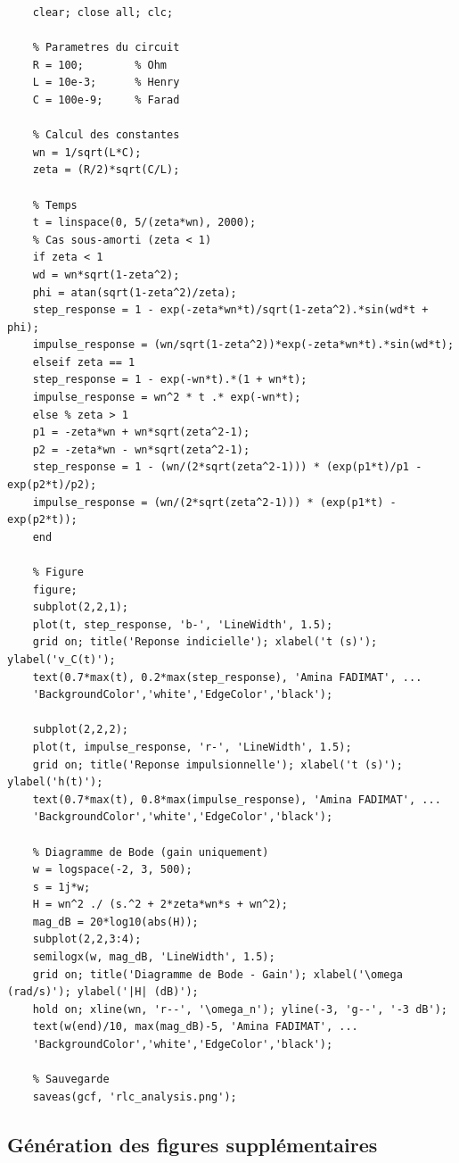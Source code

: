 \documentclass[12pt,a4paper]{article}
\begin{document}
	\begin{lstlisting}[caption=Analyse RLC sans toolbox]
	%% Analyse d'un circuit RLC (sans Control System Toolbox)
	clear; close all; clc;
	
	% Parametres du circuit
	R = 100;        % Ohm
	L = 10e-3;      % Henry
	C = 100e-9;     % Farad
	
	% Calcul des constantes
	wn = 1/sqrt(L*C);
	zeta = (R/2)*sqrt(C/L);
	
	% Temps
	t = linspace(0, 5/(zeta*wn), 2000);
	% Cas sous-amorti (zeta < 1)
	if zeta < 1
	wd = wn*sqrt(1-zeta^2);
	phi = atan(sqrt(1-zeta^2)/zeta);
	step_response = 1 - exp(-zeta*wn*t)/sqrt(1-zeta^2).*sin(wd*t + phi);
	impulse_response = (wn/sqrt(1-zeta^2))*exp(-zeta*wn*t).*sin(wd*t);
	elseif zeta == 1
	step_response = 1 - exp(-wn*t).*(1 + wn*t);
	impulse_response = wn^2 * t .* exp(-wn*t);
	else % zeta > 1
	p1 = -zeta*wn + wn*sqrt(zeta^2-1);
	p2 = -zeta*wn - wn*sqrt(zeta^2-1);
	step_response = 1 - (wn/(2*sqrt(zeta^2-1))) * (exp(p1*t)/p1 - exp(p2*t)/p2);
	impulse_response = (wn/(2*sqrt(zeta^2-1))) * (exp(p1*t) - exp(p2*t));
	end
	
	% Figure
	figure;
	subplot(2,2,1);
	plot(t, step_response, 'b-', 'LineWidth', 1.5);
	grid on; title('Reponse indicielle'); xlabel('t (s)'); ylabel('v_C(t)');
	text(0.7*max(t), 0.2*max(step_response), 'Amina FADIMAT', ...
	'BackgroundColor','white','EdgeColor','black');
	
	subplot(2,2,2);
	plot(t, impulse_response, 'r-', 'LineWidth', 1.5);
	grid on; title('Reponse impulsionnelle'); xlabel('t (s)'); ylabel('h(t)');
	text(0.7*max(t), 0.8*max(impulse_response), 'Amina FADIMAT', ...
	'BackgroundColor','white','EdgeColor','black');
	
	% Diagramme de Bode (gain uniquement)
	w = logspace(-2, 3, 500);
	s = 1j*w;
	H = wn^2 ./ (s.^2 + 2*zeta*wn*s + wn^2);
	mag_dB = 20*log10(abs(H));
	subplot(2,2,3:4);
	semilogx(w, mag_dB, 'LineWidth', 1.5);
	grid on; title('Diagramme de Bode - Gain'); xlabel('\omega (rad/s)'); ylabel('|H| (dB)');
	hold on; xline(wn, 'r--', '\omega_n'); yline(-3, 'g--', '-3 dB');
	text(w(end)/10, max(mag_dB)-5, 'Amina FADIMAT', ...
	'BackgroundColor','white','EdgeColor','black');
	
	% Sauvegarde
	saveas(gcf, 'rlc_analysis.png');
	\end{lstlisting}
	
	\subsection{Génération des figures supplémentaires}
	
\end{document}
